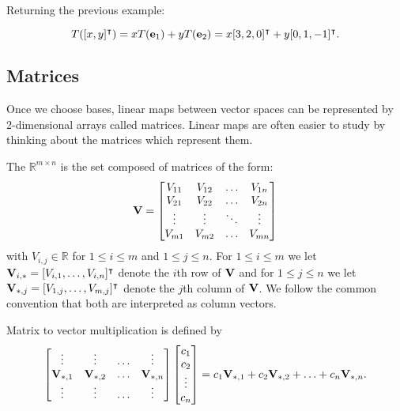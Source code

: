 \begin{example}
Returning the previous example: 

$$T([x,y]^\intercal) = x T(\ve_1) + y T(\ve_2) = x [3,2,0]^\intercal
+ y [0,1,-1]^\intercal. $$
\end{example}

\subsection{Matrices}

Once we choose bases, linear maps between vector spaces can be represented by 2-dimensional arrays called matrices. Linear maps are often easier to study by thinking about the matrices which represent them. 

\begin{definition}
The  $\mathbb R^{m \times n}$ is the set composed of matrices of the form: 
$$
\MV =
\begin{bmatrix}
V_{11} & V_{12} & \ldots & V_{1n} \\
V_{21} & V_{22} & \ldots & V_{2n} \\
\vdots & \vdots & \ddots & \vdots \\
V_{m1} & V_{m2} & \ldots & V_{mn} \\
\end{bmatrix} $$
with $V_{i,j} \in \mathbb R$ for $1\leq i\leq m$ and $1\leq j\leq n$. For $1\leq i\leq m$ we let $\MV_{i,*} = [V_{i,1},\dots,V_{i,n}]^\intercal$ denote the $i$th row of $\MV$ and for $1\leq j\leq n$ we let $\MV_{*,j} = [V_{1,j},\dots,V_{m,j}]^\intercal$ denote the $j$th column of $\MV$. We follow the common convention that both are interpreted as column vectors.
\end{definition}

\begin{definition}
Matrix to vector multiplication is defined by 
$$\begin{bmatrix}
\vdots & \vdots & \ldots & \vdots \\
\MV_{*,1} & \MV_{*,2} & \ldots & \MV_{*,n} \\
\vdots & \vdots & \ldots & \vdots \\
\end{bmatrix} \begin{bmatrix}
c_1 \\
c_2 \\
\vdots \\
c_n
\end{bmatrix} = c_1 \MV_{*,1} + c_2 \MV_{*,2} + \ldots + c_n \MV_{*,n}.$$
\end{definition}

